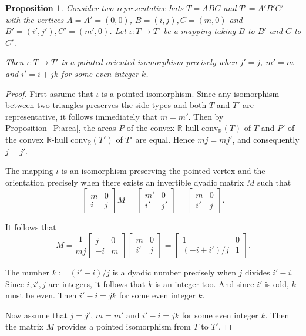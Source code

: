 \documentclass[12pt]{amsart}
\def\mr{\mathrm}
\def\mbR{\mathbb{R}}
\theoremstyle{plain}
\newtheorem{proposition}[theorem]{Proposition}
\theoremstyle{definition}
\numberwithin{equation}{section}
\begin{document}
\begin{proposition}\label{P:hathat}
Consider two representative hats $T = ABC$ and $T' = A'B'C'$ with the vertices $A = A' = (0,0)$, $B = (i,j), C = (m,0)$ and $B' = (i',j'), C' = (m',0)$. Let $\iota: T \rightarrow T'$ be a mapping taking $B$ to $B'$ and $C$ to $C'$.

Then $\iota: T \rightarrow T'$ is a pointed oriented isomorphism precisely when $j' = j$, $m' = m$ and $i' = i + jk$ for some even integer $k$.
 \end{proposition}
\begin{proof}
First assume that $\iota$ is a pointed isomorphism.
Since any isomorphism between two triangles preserves the side types and both $T$ and $T'$  are representative, it follows immediately that $m = m'$. Then by Proposition~\ref{P:area}, the areas $P$ of the convex $\mbR$-hull $\mr{conv}_{\mbR}(T)$ of $T$ and $P'$ of the convex
$\mbR$-hull $\mr{conv}_{\mbR}(T')$ of $T'$ are equal. Hence $mj = mj'$, and consequently $j =
j'$.

The mapping $\iota$ is an isomorphism preserving the pointed vertex and the orientation
precisely when there exists an invertible dyadic matrix $M$ such that
\begin{equation}
\begin{bmatrix}
m&0\\
i&j
\end{bmatrix}
M =
\begin{bmatrix}
m'&0\\
i'&j'
\end{bmatrix}
=
\begin{bmatrix}
m&0\\
i'&j
\end{bmatrix}
.
\end{equation}


It follows that
\begin{equation}
M = \frac{1}{mj}
\begin{bmatrix}
	j&0\\
	-i&m
\end{bmatrix}
\begin{bmatrix}
	m&0\\
	i'&j
\end{bmatrix}
=
\begin{bmatrix}
	1&0\\
	(-i+i')/j&1
\end{bmatrix}
.\end{equation}

The number $k := (i' - i)/j$ is a dyadic number precisely when $j$ divides $i' - i$. Since $i,
i', j$ are integers, it follows that $k$ is an integer too. And since $i'$ is odd, $k$ must be
even. Then $i' - i = jk$ for some even integer $k$.

Now assume that $j = j'$, $m = m'$ and $i' - i = jk$ for some even integer $k$. Then the matrix $M$ provides a pointed isomorphism from $T$ to $T'$.
\end{proof}
\end{document}
